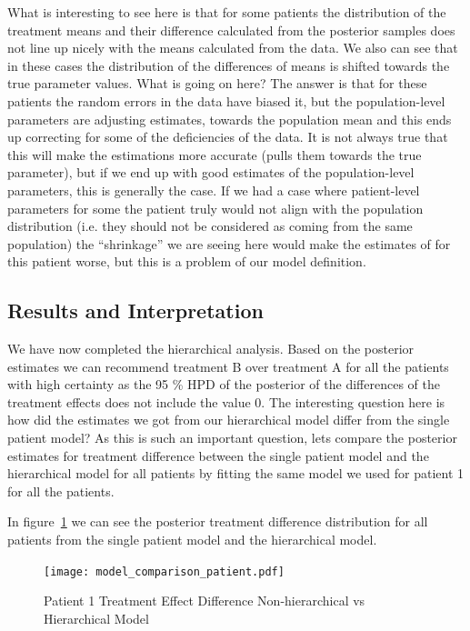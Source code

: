 \documentclass[12pt,a4paper,leqno]{report}
\theoremstyle{plain}
\theoremstyle{definition}
\theoremstyle{remark}
\begin{document}
What is interesting to see here is that for some patients the distribution of the
treatment means and their difference calculated from the posterior samples does not line
up nicely with the means calculated from the data. We also can see that in these cases
the distribution of the differences of means is shifted towards the true parameter
values. What is going on here? The answer is that for these patients the random errors
in the data have biased it, but the population-level parameters are adjusting estimates,
towards the population mean and this ends up correcting for some of the deficiencies of
the data. It is not always true that this will make the estimations more accurate
(pulls them towards the true parameter), but if we end up with good estimates of the
population-level parameters, this is generally the case. If we had a case where
patient-level parameters for some the patient truly would not align with the population
distribution (i.e. they should not be considered as coming from the same population) the
``shrinkage'' we are seeing here would make the estimates of for this patient worse, but
this is a problem of our model definition.

\subsection{Results and Interpretation}

We have now completed the hierarchical analysis. Based on the posterior estimates we can
recommend treatment B over treatment A for all the patients with high certainty
as the 95 \% HPD of the posterior of the differences of the treatment effects does not
include the value 0. The interesting question here is how did the estimates we got from
our hierarchical model differ from the single patient model? As this is such an important
question, lets compare the posterior estimates for treatment difference between the
single patient model and the hierarchical model for all patients by fitting the same model
we used for patient 1 for all the patients.

In figure\ \ref{modelcomparisonpatient} we can see the posterior treatment difference
distribution for all patients from the single patient model and the hierarchical model.


\bigskip
\begin{figure}[H]
    \caption{Patient 1 Treatment Effect Difference Non-hierarchical vs Hierarchical Model}\label{modelcomparisonpatient}
    \bigskip
    \texttt{[image: model\_comparison\_patient.pdf]}
\end{figure}
\bigskip
\end{document}
